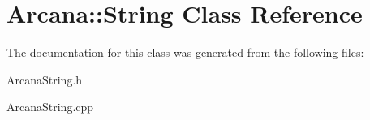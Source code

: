 \hypertarget{class_arcana_1_1_string}{}\section{Arcana\+:\+:String Class Reference}
\label{class_arcana_1_1_string}


The documentation for this class was generated from the following files\+:\begin{DoxyCompactItemize}
\item 
Arcana\+String.\+h\item 
Arcana\+String.\+cpp\end{DoxyCompactItemize}
